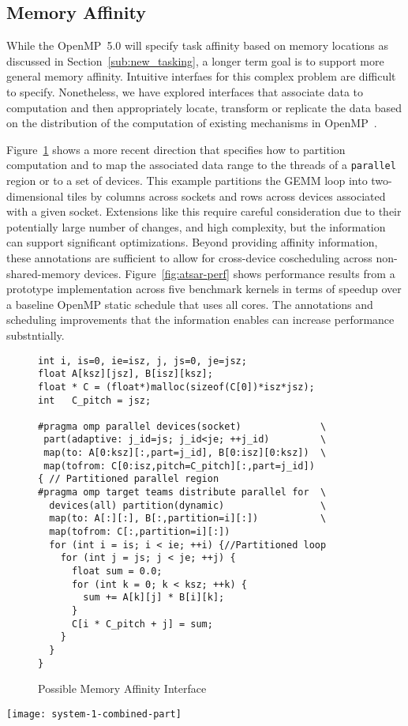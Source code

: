 \subsection{Memory Affinity}
\label{sub:memory_affinity}

While the OpenMP~5.0 will specify task affinity based on memory locations 
as discussed in Section~\ref{sub:new_tasking}, a longer term goal is to 
support more general memory affinity. Intuitive interfaes for this complex 
problem are difficult to specify. Nonetheless, we have explored interfaces
that associate data to computation and then appropriately locate, transform 
or replicate the data based on the distribution of the computation of existing
mechanisms in OpenMP~\cite{ctsar-tpds,scogland:7Hpt64iV}.
 
Figure~\ref{fig:atsar-gemm} shows a more recent direction that specifies how
to partition computation and to map the associated data range to the threads 
of a \texttt{parallel} region or to a set of devices. This example partitions 
the GEMM loop into two-dimensional tiles by columns across sockets and rows 
across devices associated with a given socket. Extensions like this require 
careful consideration due to their potentially large number of changes, and 
high complexity, but the information can support significant optimizations.
Beyond providing affinity information, these annotations are sufficient to 
allow for cross-device coscheduling across non-shared-memory devices.  
Figure~\ref{fig:atsar-perf} shows performance results from a prototype 
implementation across five benchmark kernels in terms of speedup over a 
baseline OpenMP static schedule that uses all cores. The annotations and 
scheduling improvements that the information enables can increase performance 
substntially.

\begin{figure}
  \begin{verbatim}
int i, is=0, ie=isz, j, js=0, je=jsz;
float A[ksz][jsz], B[isz][ksz];
float * C = (float*)malloc(sizeof(C[0])*isz*jsz);
int   C_pitch = jsz;

#pragma omp parallel devices(socket)              \
 part(adaptive: j_id=js; j_id<je; ++j_id)         \
 map(to: A[0:ksz][:,part=j_id], B[0:isz][0:ksz])  \
 map(tofrom: C[0:isz,pitch=C_pitch][:,part=j_id])
{ // Partitioned parallel region
#pragma omp target teams distribute parallel for  \
  devices(all) partition(dynamic)                 \
  map(to: A[:][:], B[:,partition=i][:])           \
  map(tofrom: C[:,partition=i][:])
  for (int i = is; i < ie; ++i) {//Partitioned loop
    for (int j = js; j < je; ++j) {
      float sum = 0.0;
      for (int k = 0; k < ksz; ++k) {
        sum += A[k][j] * B[i][k];
      }
      C[i * C_pitch + j] = sum;
    }
  }
}
\end{verbatim}
\caption{Possible Memory Affinity Interface\label{fig:atsar-gemm}}
\end{figure}

\begin{figure*}[t]
        \texttt{[image: system-1-combined-part]}
        \caption{Performance Benefit of Memory Partitioning/Affinity\label{fig:atsar-perf}}
\end{figure*}



